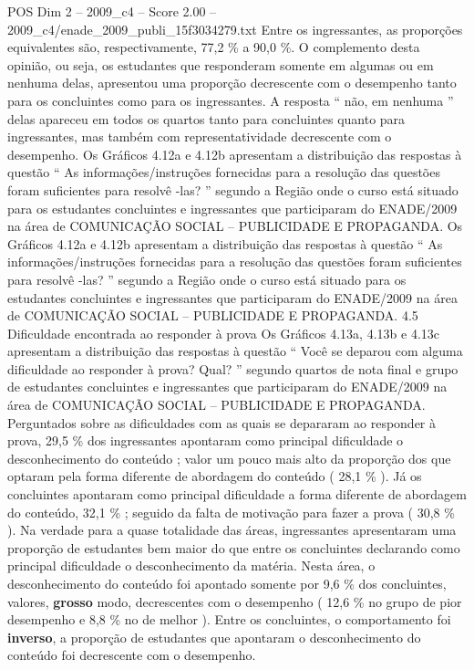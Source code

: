\begin{textsample}{POS Dim 2 – 2009\_c4 – Score 2.00 – 2009\_c4/enade\_2009\_publi\_15f3034279.txt}
Entre os ingressantes, as proporções equivalentes são, respectivamente, 77,2 \% a 90,0 \%.
O complemento desta opinião, ou seja, os estudantes que responderam somente em algumas ou em nenhuma delas, apresentou uma proporção decrescente com o desempenho tanto para os concluintes como para os ingressantes.
A resposta “ não, em nenhuma ” delas apareceu em todos os quartos tanto para concluintes quanto para ingressantes, mas também com representatividade decrescente com o desempenho.
Os Gráficos 4.12a e 4.12b apresentam a distribuição das respostas à questão “ As informações/instruções fornecidas para a resolução das questões foram suficientes para resolvê -las? ” segundo a Região onde o curso está situado para os estudantes concluintes e ingressantes que participaram do ENADE/2009 na área de COMUNICAÇÃO SOCIAL – PUBLICIDADE E PROPAGANDA.
Os Gráficos 4.12a e 4.12b apresentam a distribuição das respostas à questão “ As informações/instruções fornecidas para a resolução das questões foram suficientes para resolvê -las? ” segundo a Região onde o curso está situado para os estudantes concluintes e ingressantes que participaram do ENADE/2009 na área de COMUNICAÇÃO SOCIAL – PUBLICIDADE E PROPAGANDA. 4.5 Dificuldade encontrada ao responder à prova Os Gráficos 4.13a, 4.13b e 4.13c apresentam a distribuição das respostas à questão “ Você se deparou com alguma dificuldade ao responder à prova?
Qual? ” segundo quartos de nota final e grupo de estudantes concluintes e ingressantes que participaram do ENADE/2009 na área de COMUNICAÇÃO SOCIAL – PUBLICIDADE E PROPAGANDA.
Perguntados sobre as dificuldades com as quais se depararam ao responder à prova, 29,5 \% dos ingressantes apontaram como principal dificuldade o desconhecimento do conteúdo ; valor um pouco mais alto da proporção dos que optaram pela forma diferente de abordagem do conteúdo ( 28,1 \% ).
Já os concluintes apontaram como principal dificuldade a forma diferente de abordagem do conteúdo, 32,1 \% ; seguido da falta de motivação para fazer a prova ( 30,8 \% ).
Na verdade para a quase totalidade das áreas, ingressantes apresentaram uma proporção de estudantes bem maior do que entre os concluintes declarando como principal dificuldade o desconhecimento da matéria.
Nesta área, o desconhecimento do conteúdo foi apontado somente por 9,6 \% dos concluintes, valores, \textbf{grosso} modo, decrescentes com o desempenho ( 12,6 \% no grupo de pior desempenho e 8,8 \% no de melhor ).
Entre os concluintes, o comportamento foi \textbf{inverso}, a proporção de estudantes que apontaram o desconhecimento do conteúdo foi decrescente com o desempenho.

\end{textsample}
